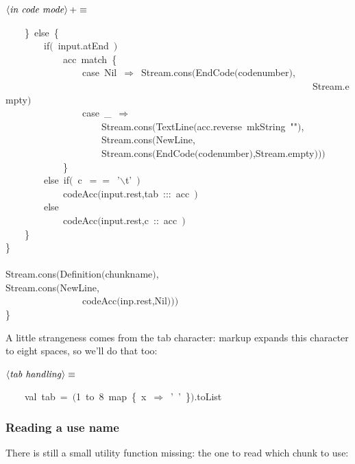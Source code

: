 \documentclass[a4paper,12pt]{article}
\begin{document}
$\left<\mbox{\emph{in code mode}}\right>+\equiv$
\begin{program}~~~~{\small\}}~{\vem else}~{\small\{}
\\~~~~~~~~{\vem if}$($~input.atEnd~$)$
\\~~~~~~~~~~~~acc~{\vem match}~{\small\{}
\\~~~~~~~~~~~~~~~~{\vem case}~Nil~$\Rightarrow$~Stream.cons$($EndCode$($codenumber$)$,
\\~~~~~~~~~~~~~~~~~~~~~~~~~~~~~~~~~~~~~~~~~~~~~~~~~~~~~~~~~~~~~~~~Stream.empty$)$
\\~~~~~~~~~~~~~~~~{\vem case}~\_~$\Rightarrow$
\\~~~~~~~~~~~~~~~~~~~~Stream.cons$($TextLine$($acc.reverse~mkString~""$)$,
\\~~~~~~~~~~~~~~~~~~~~Stream.cons$($NewLine,
\\~~~~~~~~~~~~~~~~~~~~Stream.cons$($EndCode$($codenumber$)$,Stream.empty$)$$)$$)$
\\~~~~~~~~~~~~{\small\}}
\\~~~~~~~~{\vem else}~{\vem if}$($~c~$==$~'$\backslash$t'~$)$
\\~~~~~~~~~~~~codeAcc$($input.rest,tab~{\rm :}{\rm :}{\rm :}~acc~$)$
\\~~~~~~~~{\vem else}
\\~~~~~~~~~~~~codeAcc$($input.rest,c~{\rm :}{\rm :}~acc~$)$
\\~~~~{\small\}}
\\{\small\}}
\\~~~~~~~~
\\Stream.cons$($Definition$($chunkname$)$,
\\Stream.cons$($NewLine,
\\~~~~~~~~~~~~~~~~codeAcc$($inp.rest,Nil$)$$)$$)$
\\{\small\}}
\\[0.5em]\end{program}
A little strangeness comes from the tab character: markup expands this character
to eight spaces, so we'll do that too:

$\left<\mbox{\emph{tab handling}}\right>\equiv$
\begin{program}~~~~{\vem val}~tab~=~$($1~to~8~map~{\small\{}~x~$\Rightarrow$~'~'~{\small\}}$)$.toList
\\[0.5em]\end{program}
\subsubsection{Reading a use name}
There is still a small utility function missing: the one to read which
chunk to use:
\end{document}
